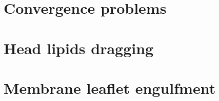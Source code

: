 

\section{Convergence problems}


\section{Head lipids dragging}

\section{Membrane leaflet engulfment}
